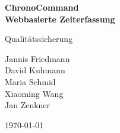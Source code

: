 \documentclass[hidelinks]{scrartcl}
\begin{document}
	\setlength{\parindent}{0pt}

	\begin{titlepage}

		\begin{center}
			\huge \bfseries ChronoCommand \\
			\large  Webbasierte Zeiterfassung
		\end{center}

		\begin{center}
				\large Qualitätssicherung \\
		\end{center}

		\begin{center}
			Jannis Friedmann \\
			David Kuhmann \\
			Maria Schmid \\
			Xiaoming Wang \\
			Jan Zenkner \\

		\end{center}

		\begin{center}
			\large \today
		\end{center}
	
		\vfill
	\end{titlepage}
	\thispagestyle{empty}


	\clearpage
	\pagestyle{empty}
	\tableofcontents

	\clearpage
	\pagestyle{plain}
	\setcounter{page}{1}

	
	
	
	
\end{document}
